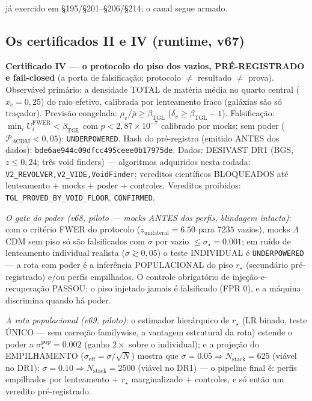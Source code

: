 \documentclass[11pt]{article}
\newcommand{\bTGL}{\beta_{\mathrm{TGL}}}\newcommand{\Msun}{M_{\odot}}\newcommand{\TGL}{\mathrm{TGL}}
\theoremstyle{definition}\newtheorem{deriv}{Derivação}
\begin{document}
já exercido em \S195/\S201--\S206/\S214; o canal segue armado.

\subsection*{Os certificados II e IV (runtime, v67)}

\textbf{Certificado IV --- o protocolo do piso dos vazios, PRÉ-REGISTRADO e fail-closed} (a porta de falsificação; protocolo $\neq$ resultado $\neq$ prova). Observável primário: a densidade TOTAL de matéria média no quarto central ($x_c=0{,}25$) do raio efetivo, calibrada por lenteamento fraco (galáxias são só traçador). Previsão congelada: $\rho_v/\bar\rho\ge\bTGL$ ($\delta_v\ge\bTGL-1$). Falsificação: $\min_i U_i^{\mathrm{FWER}}<\bTGL$ com $p<2{,}87\times10^{-7}$ calibrado por mocks; sem poder ($\mathcal P_{\Lambda\mathrm{CDM}}<0{,}05$): \texttt{UNDERPOWERED}. Hash do pré-registro (emitido ANTES dos dados): \texttt{bde6ae944c09dfcc495ceee0b17975de}. Dados: DESIVAST DR1 (BGS, $z\le0{,}24$; três void finders) --- algoritmos adquiridos nesta rodada: \texttt{V2\_REVOLVER,V2\_VIDE,VoidFinder}; vereditos científicos BLOQUEADOS até lenteamento $+$ mocks $+$ poder $+$ controles. Vereditos proibidos: \texttt{TGL\_PROVED\_BY\_VOID\_FLOOR}, \texttt{CONFIRMED}.

\emph{O gate do poder (v68, piloto --- mocks ANTES dos perfis, blindagem intacta)}: com o critério FWER do protocolo ($z_{\mathrm{unilateral}}=6.50$ para $7235$ vazios), mocks $\Lambda$CDM sem piso só são falsificados com $\sigma$ por vazio $\le\sigma_\star=0.001$; em ruído de lenteamento individual realista ($\sigma\gtrsim0{,}05$) o teste INDIVIDUAL é \texttt{UNDERPOWERED} --- a rota com poder é a inferência POPULACIONAL do piso $r_\star$ (secundário pré-registrado) e/ou perfis empilhados. O controle obrigatório de injeção-e-recuperação PASSOU: o piso injetado jamais é falsificado (FPR $0$), e a máquina discrimina quando há poder.

\emph{A rota populacional (v69, piloto)}: o estimador hierárquico de $r_\star$ (LR binado, teste ÚNICO --- sem correção familywise, a vantagem estrutural da rota) estende o poder a $\sigma^{\mathrm{pop}}_\star=0.002$ (ganho $2\times$ sobre o individual); e a projeção do EMPILHAMENTO ($\sigma_{\mathrm{eff}}=\sigma/\sqrt{N}$) mostra que $\sigma=0.05\Rightarrow N_{\mathrm{stack}}=625$ (viável no DR1); $\sigma=0.10\Rightarrow N_{\mathrm{stack}}=2500$ (viável no DR1) --- o pipeline final é: perfis empilhados por lenteamento $+$ $r_\star$ marginalizado $+$ controles, e só então um veredito pré-registrado.
\end{document}
